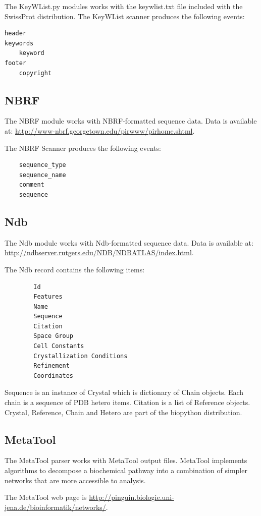 \documentclass{report}
\begin{document}
The KeyWList.py modules works with the keywlist.txt file included with
the SwissProt distribution.
The KeyWList scanner produces the following events:
\begin{verbatim}
header
keywords
    keyword
footer
    copyright
\end{verbatim}

\subsection{NBRF}

The NBRF module works with NBRF-formatted sequence data.  Data is available at:
\url{http://www-nbrf.georgetown.edu/pirwww/pirhome.shtml}.

The NBRF Scanner produces the following events:
\begin{verbatim}
    sequence_type
    sequence_name
    comment
    sequence
\end{verbatim}

\subsection{Ndb}

The Ndb module works with Ndb-formatted sequence data.  Data is available at:
\url{http://ndbserver.rutgers.edu/NDB/NDBATLAS/index.html}.

The Ndb record contains the following items:
\begin{verbatim}
        Id
        Features
        Name
        Sequence
        Citation
        Space Group
        Cell Constants
        Crystallization Conditions
        Refinement
        Coordinates
\end{verbatim}

Sequence is an instance of Crystal which is dictionary of Chain objects.  Each chain is a sequence of PDB hetero items.  Citation is a list of Reference objects.  Crystal, Reference, Chain and Hetero are part of the biopython distribution.

\subsection{MetaTool}

The MetaTool parser works with MetaTool output files.  MetaTool implements algorithms to decompose a biochemical pathway into a combination of simpler networks that are more accessible to analysis.

The MetaTool web page is \url{http://pinguin.biologie.uni-jena.de/bioinformatik/networks/}.
\end{document}
